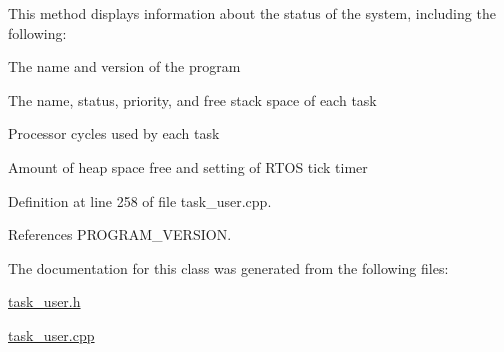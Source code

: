 This method displays information about the status of the system, including the following\+: \begin{DoxyItemize}
\item The name and version of the program \item The name, status, priority, and free stack space of each task \item Processor cycles used by each task \item Amount of heap space free and setting of R\+T\+OS tick timer \end{DoxyItemize}


Definition at line 258 of file task\+\_\+user.\+cpp.



References P\+R\+O\+G\+R\+A\+M\+\_\+\+V\+E\+R\+S\+I\+ON.



The documentation for this class was generated from the following files\+:\begin{DoxyCompactItemize}
\item 
\mbox{\hyperlink{task__user_8h}{task\+\_\+user.\+h}}\item 
\mbox{\hyperlink{task__user_8cpp}{task\+\_\+user.\+cpp}}\end{DoxyCompactItemize}
